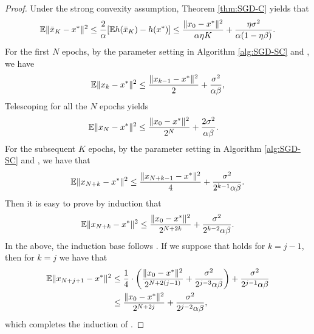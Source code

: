{\begin{proof}
Under the strong convexity assumption, Theorem \ref{thm:SGD-C} yields that
\begin{align} \label{eq:each-epoch}
    {\mathbb{E}} \Vert \bar x_K - x^* \Vert^2 \le \frac{2}{\alpha} [{\mathbb{E}} h(\bar x_K)  - h(x^*)] \le  \frac{\Vert x_0 - x^* \Vert^2}{\alpha \eta K} + \frac{\eta \sigma^2}{\alpha (1 - \eta \beta)}.
\end{align}
For the first $N$ epochs,  by the parameter setting in Algorithm \ref{alg:SGD-SC} and , we have
\begin{align*}
    {\mathbb{E}} \Vert x_{k} - x^* \Vert^2 \le \frac{\Vert x_{k-1} - x^* \Vert^2}{2} + \frac{\sigma^2}{\alpha \beta},
\end{align*}
Telescoping for all the $N$ epochs yields
\begin{align}
     {\mathbb{E}} \Vert x_N - x^* \Vert^2 &\le \frac{\Vert x_0 -x^* \Vert^2}{2^N} + \frac{2 \sigma^2}{\alpha \beta}. \label{eq:EpochSGD-xN}
\end{align}
For the subsequent $K$ epochs, by the parameter setting in Algorithm \ref{alg:SGD-SC} and , we have that 
\begin{align*}
   {\mathbb{E}} \Vert x_{N+k} - x^* \Vert^2 \le \frac{\Vert x_{N+k-1} - x^* \Vert^2}{4} + \frac{\sigma^2}{2^{k-1} \alpha \beta}.
\end{align*}
Then it is easy to prove by induction that
\begin{align} \label{eq:induction-SGD}
    {\mathbb{E}} \Vert x_{N+k} - x^* \Vert^2 \le \frac{\Vert x_0 - x^* \Vert^2}{2^{N+2k}} + \frac{\sigma^2}{2^{k-2} \alpha \beta}.
\end{align}
In the above, the induction base follows . If we suppose that  holds for $k=j-1$, then for $k=j$ we have that
\begin{align*}
    {\mathbb{E}} \Vert x_{N+j+1} - x^* \Vert^2 &\le \frac{1}{4} \cdot \left( \frac{\Vert x_0 -x^* \Vert^2}{2^{N+2(j-1)}} + \frac{\sigma^2}{2^{j-3} \alpha \beta} \right) + \frac{\sigma^2}{2^{j-1} \alpha \beta} \\
    &\le \frac{\Vert x_0 - x^* \Vert^2}{2^{N+2j}} + \frac{\sigma^2}{2^{j-2} \alpha \beta},
\end{align*}
which completes the induction of .
\end{proof}
}


